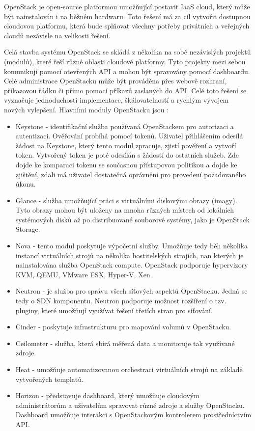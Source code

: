 OpenStack je open-source platformou umožňující postavit IaaS cloud, který může být nainstalován i na běžném hardwaru. Toto řešení má za cíl vytvořit dostupnou cloudovou platformu, která bude splňovat všechny potřeby privátních a veřejných cloudů nezávisle na velikosti řešení. \cite{OpenStack}

Celá stavba systému OpenStack se skládá z několika na sobě nezávislých projektů (modulů), které řeší různé oblasti cloudové platformy. Tyto projekty mezi sebou komunikují pomocí otevřených API a mohou být spravovány pomocí dashboardu. Celé administrace OpenStacku může být prováděna přes webově rozhraní, příkazovou řádku či přímo pomocí příkazů zaslaných do API. Celé toto řešení se vyznačuje jednoduchostí implementace, škálovatelností a rychlým vývojem nových vylepšení. Hlavními moduly OpenStacku jsou \cite{OpenStack} \cite{OpenStack2}:

\begin{itemize}
\item Keystone - identifikační služba používaná OpenStackem pro autorizaci a autentizaci. Ověřování probíhá pomocí tokenů. Uživatel přihlášením odesílá žádost na Keystone, který tento modul zpracuje, zjistí pověření a vytvoří token. Vytvořený token je poté odesílán s žádostí do ostatních služeb. Zde dojde ke komparaci tokenu se současnou přístupovou politikou a dojde ke zjištění, zdali má uživatel dostatečná oprávnění pro provedení požadovaného úkonu.
\item Glance - služba umožňující práci s virtuálními diskovými obrazy (imagy). Tyto obrazy mohou být uloženy na mnoha různých místech od lokálních systémových disků až po distribuované souborové systémy, jako je OpenStack Storage.
\item Nova - tento modul poskytuje výpočetní služby. Umožňuje tedy běh několika instancí virtuálních strojů na několika hostitelských strojích, nan kterých je nainstalována služba OpenStack compute. OpenStack podporuje hypervizory KVM, QEMU, VMware ESX, Hyper-V, Xen. 
\item Neutron - je služba pro správu všech síťových aspektů OpenStacku. Jedná se tedy o SDN komponentu. Neutron podporuje možnost rozšíření o tzv. pluginy, které umožňují využívat řešení třetích stran pro síťování.
\item Cinder - poskytuje infrastrukturu pro mapování volumů v OpenStacku.
\item Ceilometer - služba, která sbírá měřená data a monitoruje tak využívané zdroje.
\item Heat - umožňuje automatizovanou orchestraci virtuálních strojů na základě vytvořených templatů.
\item Horizon - představuje dashboard, který umožňuje cloudovým administrátorům a uživatelům spravovat různé zdroje a služby OpenStacku. Dashboard umožňuje interakci s OpenStackovým kontrolerem prostředníctvím API. 
\end{itemize}


